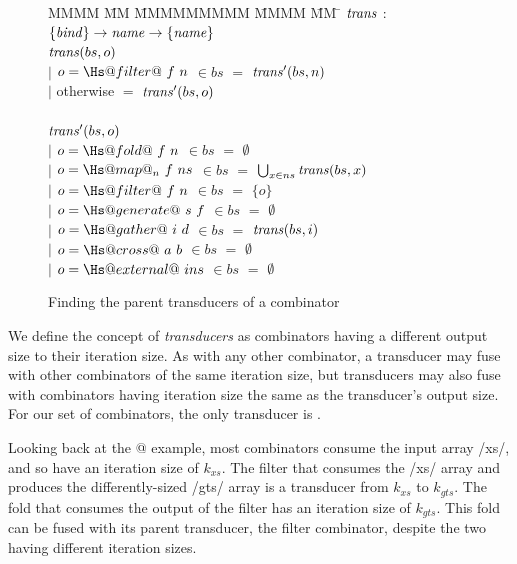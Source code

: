 \begin{figure}
\begin{tabbing}
MMMM \= MM \= MMMMMMMMM \= MMMM \= MM \= \kill
$\mathit{trans}$  \>$:$\> $\{\mathit{bind}\} \rightarrow \mathit{name} \rightarrow \{\mathit{name}\}$ \\
$\mathit{trans}(bs,o)$    \\
            \> $|$ \> $o = \Hs@filter@~f~n$    \> $\in bs$ \> $=$ \> $\mathit{trans}'(bs,n)$ \\
            \> $|$ \> otherwise             \>          \> $=$ \> $\mathit{trans}'(bs,o)$ \\
\\
$\mathit{trans}'(bs,o)$    \\
            \> $|$ \> $o = \Hs@fold@~f~n$      \> $\in bs$ \> $=$ \> $\emptyset$ \\
            \> $|$ \> $o = \Hs@map@_n~f~ns$    \> $\in bs$ \> $=$ \> $\bigcup_{x \in ns} \mathit{trans}(bs, x)$ \\
            \> $|$ \> $o = \Hs@filter@~f~n$    \> $\in bs$ \> $=$ \> $\{o\}$       \\
            \> $|$ \> $o = \Hs@generate@~s~f$  \> $\in bs$ \> $=$ \> $\emptyset$ \\
            \> $|$ \> $o = \Hs@gather@~i~d$    \> $\in bs$ \> $=$ \> $\mathit{trans}(bs,i)$ \\
            \> $|$ \> $o = \Hs@cross@~a~b$     \> $\in bs$ \> $=$ \> $\emptyset$ \\
            \> $|$ \> $o = \Hs@external@~ins$  \> $\in bs$ \> $=$ \> $\emptyset$ \\
\end{tabbing}
\caption{Finding the parent transducers of a combinator}
\label{fig:clustering:trans}
\end{figure}

We define the concept of \emph{transducers} as combinators having a different output size to their iteration size.
As with any other combinator, a transducer may fuse with other combinators of the same iteration size, but transducers may also fuse with combinators having iteration size the same as the transducer's output size.
For our set of combinators, the only transducer is \Hs@filter@.

Looking back at the @ example, most combinators consume the input array \Hs/xs/, and so have an iteration size of $k_{xs}$.
The filter that consumes the \Hs/xs/ array and produces the differently-sized \Hs/gts/ array is a transducer from $k_{xs}$ to $k_{gts}$.
The fold that consumes the output of the filter has an iteration size of $k_{gts}$.
This fold can be fused with its parent transducer, the filter combinator, despite the two having different iteration sizes.

